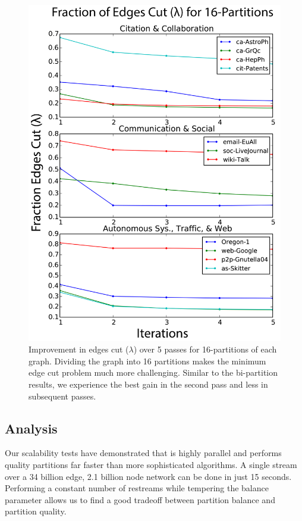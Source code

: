\begin{figure}[t!]
\centering
\includegraphics[width=0.9\columnwidth] {figures/real_k16_lambda.pdf}
\caption[Caption for]{Improvement in edges cut ($\lambda$) over 5 passes for 16-partitions of each graph. Dividing the graph into 16 partitions makes the minimum edge cut problem much more challenging. Similar to the bi-partition results, we experience the best gain in the second pass and less in subsequent passes.}
\label{fig:k16_lambda}
\end{figure}

\subsection{Analysis} \label{sec:anal}
Our scalability tests have demonstrated that \ourmethod is highly parallel and performs quality partitions far faster than more sophisticated algorithms. A single stream over a 34 billion edge, 2.1 billion node network can be done in just 15 seconds. Performing a constant number of restreams while tempering the balance parameter allows us to find a good tradeoff between partition balance and partition quality. 

